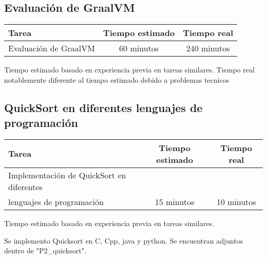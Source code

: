 \documentclass[12pt,a4paper]{article}
\begin{document}
\subsection{Evaluación de GraalVM}
    \begin{center}
        \begin{tabular}{|l|c|c|}
            \hline
            \textbf{Tarea} & \textbf{Tiempo estimado} & \textbf{Tiempo real} \\
            \hline
            Evaluación de GraalVM & 60 minutos & 240 minutos \\
            \hline
        \end{tabular}
    \end{center}
    \begin{center}
        Tiempo estimado basado en experiencia previa en tareas similares.
        \newline
        Tiempo real notablemente diferente al tiempo estimado debido a problemas tecnicos
    \end{center}


\subsection{QuickSort en diferentes lenguajes de programación}
    \begin{center}
        \begin{tabular}{|l|c|c|}
            \hline
            \textbf{Tarea} & \textbf{Tiempo estimado} & \textbf{Tiempo real} \\
            \hline
            Implementación de QuickSort en diferentes \\ lenguajes de programación & 15 minutos & 10 minutos \\
            \hline
        \end{tabular}
    \end{center}
    \begin{center}
        Tiempo estimado basado en experiencia previa en tareas similares.
    \end{center}

Se implemento Quicksort en C, Cpp, java y python. Se encuentran adjuntos dentro de "P2\_quicksort\/".
\end{document}
